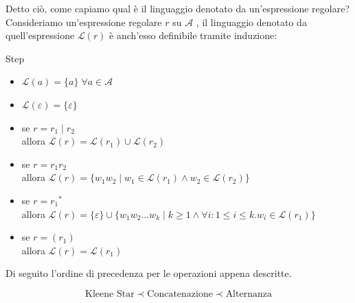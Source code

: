 \documentclass[class=book, crop=false, oneside, 12pt]{standalone}
\begin{document}
Detto ciò, come capiamo qual è il linguaggio denotato da un’espressione regolare?
Consideriamo un’espressione regolare \(r\) su \(\mathcal{A}\) , il linguaggio denotato da quell'espressione \(\mathcal{L}(r)\) è anch'esso definibile tramite induzione:
\begin{labeling}{Step}
    \item[Base] \begin{itemize}
                    \item \(\mathcal{L}(a) = \{a\} \; \forall a \in \mathcal{A}\)
                    \item \(\mathcal{L}(\varepsilon) = \{\varepsilon\}\)
                \end{itemize}
    \item[Step] \begin{itemize}
                    \item se \(r = r_1 \mid r_2 \) \\
                    allora \(\mathcal{L}(r)= \mathcal{L}(r_1) \cup \mathcal{L}(r_2)\)
                    \item se \(r=r_1 r_2\) \\
                    allora \(\mathcal{L}(r) = \{w_1 w_2 \mid w_1 \in \mathcal{L}(r_1) \land w_2 \in \mathcal{L}(r_2)\}\)
                    \item se \(r = r_1\)\(^\ast\) \\
                    allora \( \mathcal{L}(r) = \{ \varepsilon \} \cup \{ w_1 w_2 ... w_k \mid k \ge 1 \land \forall i : 1 \le i \le k.w_i \in \mathcal{L}(r_1)\} \)
                    \item se \(r=(r_1)\) \\allora \( \mathcal{L}(r) = \mathcal{L}(r_1)\)
                \end{itemize}
\end{labeling}

\noindent Di seguito l'ordine di precedenza per le operazioni appena descritte.

\begin{equation*}
    \textrm{Kleene Star} \prec \textrm{Concatenazione} \prec \textrm{Alternanza}
\end{equation*}

\end{document}
